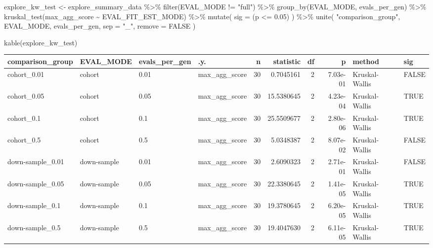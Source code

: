 \documentclass[
]{book}
\newenvironment{Shaded}{\begin{snugshade}}{\end{snugshade}}
\newcommand{\AttributeTok}[1]{\textcolor[rgb]{0.77,0.63,0.00}{#1}}
\newcommand{\ConstantTok}[1]{\textcolor[rgb]{0.00,0.00,0.00}{#1}}
\newcommand{\FloatTok}[1]{\textcolor[rgb]{0.00,0.00,0.81}{#1}}
\newcommand{\FunctionTok}[1]{\textcolor[rgb]{0.00,0.00,0.00}{#1}}
\newcommand{\NormalTok}[1]{#1}
\newcommand{\OtherTok}[1]{\textcolor[rgb]{0.56,0.35,0.01}{#1}}
\newcommand{\SpecialCharTok}[1]{\textcolor[rgb]{0.00,0.00,0.00}{#1}}
\newcommand{\StringTok}[1]{\textcolor[rgb]{0.31,0.60,0.02}{#1}}
\begin{document}
\begin{Shaded}
\begin{Highlighting}[]
\NormalTok{explore\_kw\_test }\OtherTok{\textless{}{-}}\NormalTok{ explore\_summary\_data }\SpecialCharTok{\%\textgreater{}\%}
  \FunctionTok{filter}\NormalTok{(EVAL\_MODE }\SpecialCharTok{!=} \StringTok{"full"}\NormalTok{) }\SpecialCharTok{\%\textgreater{}\%}
  \FunctionTok{group\_by}\NormalTok{(EVAL\_MODE, evals\_per\_gen) }\SpecialCharTok{\%\textgreater{}\%}
  \FunctionTok{kruskal\_test}\NormalTok{(max\_agg\_score }\SpecialCharTok{\textasciitilde{}}\NormalTok{ EVAL\_FIT\_EST\_MODE) }\SpecialCharTok{\%\textgreater{}\%}
  \FunctionTok{mutate}\NormalTok{(}
    \AttributeTok{sig =}\NormalTok{ (p }\SpecialCharTok{\textless{}=} \FloatTok{0.05}\NormalTok{)}
\NormalTok{  ) }\SpecialCharTok{\%\textgreater{}\%}
  \FunctionTok{unite}\NormalTok{(}
    \StringTok{"comparison\_group"}\NormalTok{,}
\NormalTok{    EVAL\_MODE,}
\NormalTok{    evals\_per\_gen,}
    \AttributeTok{sep =} \StringTok{"\_"}\NormalTok{,}
    \AttributeTok{remove =} \ConstantTok{FALSE}
\NormalTok{  )}

\FunctionTok{kable}\NormalTok{(explore\_kw\_test)}
\end{Highlighting}
\end{Shaded}

\begin{tabular}{l|l|l|l|r|r|r|r|l|l}
\hline
comparison\_group & EVAL\_MODE & evals\_per\_gen & .y. & n & statistic & df & p & method & sig\\
\hline
cohort\_0.01 & cohort & 0.01 & max\_agg\_score & 30 & 0.7045161 & 2 & 7.03e-01 & Kruskal-Wallis & FALSE\\
\hline
cohort\_0.05 & cohort & 0.05 & max\_agg\_score & 30 & 15.5380645 & 2 & 4.23e-04 & Kruskal-Wallis & TRUE\\
\hline
cohort\_0.1 & cohort & 0.1 & max\_agg\_score & 30 & 25.5509677 & 2 & 2.80e-06 & Kruskal-Wallis & TRUE\\
\hline
cohort\_0.5 & cohort & 0.5 & max\_agg\_score & 30 & 5.0348387 & 2 & 8.07e-02 & Kruskal-Wallis & FALSE\\
\hline
down-sample\_0.01 & down-sample & 0.01 & max\_agg\_score & 30 & 2.6090323 & 2 & 2.71e-01 & Kruskal-Wallis & FALSE\\
\hline
down-sample\_0.05 & down-sample & 0.05 & max\_agg\_score & 30 & 22.3380645 & 2 & 1.41e-05 & Kruskal-Wallis & TRUE\\
\hline
down-sample\_0.1 & down-sample & 0.1 & max\_agg\_score & 30 & 19.3780645 & 2 & 6.20e-05 & Kruskal-Wallis & TRUE\\
\hline
down-sample\_0.5 & down-sample & 0.5 & max\_agg\_score & 30 & 19.4047630 & 2 & 6.11e-05 & Kruskal-Wallis & TRUE\\
\hline
\end{tabular}
\end{document}
